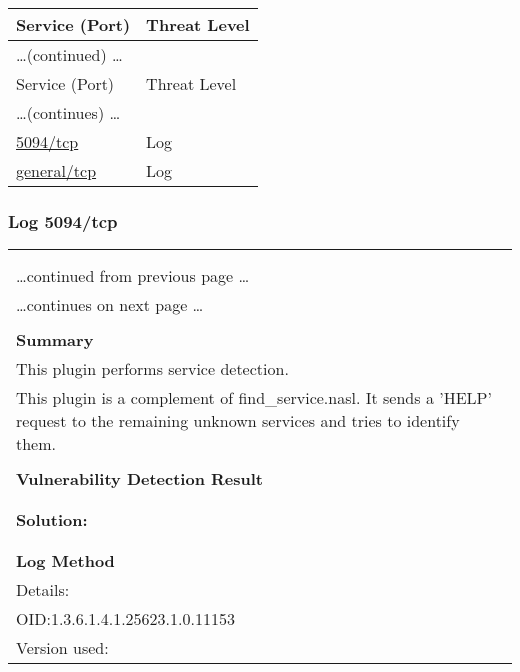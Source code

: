 \documentclass{article}
\begin{document}
\begin{longtable}{|l|l|}
\hline
\rowcolor{gvm_report}Service (Port)&Threat Level\\
\hline
\endfirsthead
\multicolumn{2}{l}{\hfill\ldots (continued) \ldots}\\
\hline
\rowcolor{gvm_report}Service (Port)&Threat Level\\
\hline
\endhead
\hline
\multicolumn{2}{l}{\ldots (continues) \ldots}\\
\endfoot
\hline
\endlastfoot
\hline
\hyperref[port:192.168.178.28 5094/tcp Log]{5094/tcp}&Log\\
\hline
\hyperref[port:192.168.178.28 general/tcp Log]{general/tcp}&Log\\
\hline
\end{longtable}



\subsubsection{Log 5094/tcp}
\label{port:192.168.178.28 5094/tcp Log}

\begin{longtable}{|p{}|}
\hline
\rowcolor{gvm_log}{\color{white}{Log (CVSS: 0.0) }}\\
\rowcolor{gvm_log}{\color{white}{NVT: Service Detection with 'HELP' Request'}}\\
\hline
\endfirsthead
\hfill\ldots continued from previous page \ldots \\
\hline
\endhead
\hline
\ldots continues on next page \ldots \\
\endfoot
\hline
\endlastfoot
\\
\textbf{Summary}\\
This plugin performs service detection.\\
  This plugin is a complement of find\_service.nasl. It sends a 'HELP'
  request to the remaining unknown services and tries to identify them.\\

        \hline
        \\
\textbf{Vulnerability Detection Result}\\
\rowcolor{white}{\verb=A service responding with an SSL/TLS alert seems to be running on this port.=}\\

          \hline
          \\
\textbf{Solution:}\\
\\


        \hline
        \\
\textbf{Log Method}\\
Details:
\rowcolor{white}{\verb=Service Detection with 'HELP' Request'=}\\
OID:1.3.6.1.4.1.25623.1.0.11153\\
Version used:
\rowcolor{white}{\verb=2022-01-31T16:15:30Z=}\\
\end{longtable}
\end{document}
